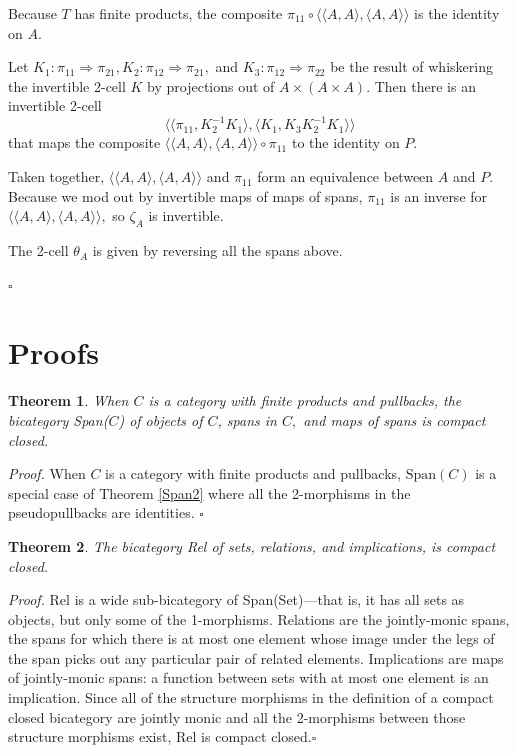 \documentclass[12pt,twoside,openright]{report}
\newtheorem{thm}{Theorem}
\newcommand{\maps}{\colon}
\newcommand{\Span}{\mbox{Span}}
\begin{document}
Because $T$ has finite products, the composite $\pi_{11}\circ \langle\langle A, A\rangle, \langle A, A\rangle\rangle$ is the identity on $A$.  

Let $K_1\maps \pi_{11}\Rightarrow \pi_{21}, K_2\maps \pi_{12} \Rightarrow \pi_{21},$ and $K_3\maps \pi_{12} \Rightarrow \pi_{22}$ be the result of whiskering the invertible 2-cell $K$ by projections out of $A\times (A\times A).$  Then there is an invertible 2-cell 
$$\langle\langle\pi_{11}, K_2^{-1}K_1\rangle, \langle K_1, K_3K_2^{-1}K_1\rangle\rangle$$
that maps the composite $\langle\langle A, A\rangle, \langle A, A\rangle\rangle \circ \pi_{11}$ to the identity on $P.$

Taken together, $\langle\langle A, A\rangle, \langle A, A\rangle\rangle$ and $\pi_{11}$ form an equivalence between $A$ and $P$.  Because we mod out by invertible maps of maps of spans, $\pi_{11}$ is an inverse for $\langle\langle A, A\rangle, \langle A, A\rangle\rangle,$ so $\zeta_A$ is invertible.

The 2-cell $\theta_A$ is given by reversing all the spans above.

$\square$

\section{Proofs}
\label{proofs}
\begin{thm}
  \label{span}
  When $C$ is a category with finite products and pullbacks, the bicategory Span($C$) of objects of $C$, spans in $C,$ and maps of spans is compact closed.
\end{thm}
{\em Proof.} When $C$ is a category with finite products and pullbacks,
$\Span(C)$ is a special case of Theorem \ref{Span2} where all the
2-morphisms in the pseudopullbacks are identities. \hfill $\square$

\begin{thm}
  The bicategory Rel of sets, relations, and implications, is compact closed.
\end{thm}
{\em Proof.} Rel is a wide sub-bicategory of Span(Set)---that is, it has all sets as objects, but only some of the 1-morphisms.  Relations are the jointly-monic spans, the spans for which there is at most one element whose image under the legs of the span picks out any particular pair of related elements.  Implications are maps of jointly-monic spans:
a function between sets with at most one element is an implication. Since all of the structure morphisms in the definition of a compact closed bicategory are jointly monic and all the 2-morphisms between those structure morphisms exist, Rel is compact closed.\hfill $\square$
\end{document}
